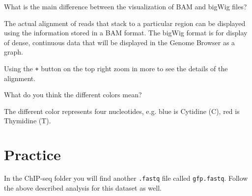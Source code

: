 \begin{questions}
What is the main difference between the visualization of BAM and bigWig files?
\begin{answer}
The actual alignment of reads that stack to a particular region can be displayed using the information stored in a BAM format.
The bigWig format is for display of dense, continuous data that will be displayed in the Genome Browser as a graph.
\end{answer}
\end{questions}

Using the \texttt{+} button on the top right zoom in more to see the details of the alignment.

\begin{questions}
What do you think the different colors mean?
\begin{answer}
The different color represents four nucleotides, e.g. blue is Cytidine (C), red is Thymidine (T).
\end{answer}
\end{questions}

\section{Practice}
In the ChIP-seq folder you will find another \texttt{.fastq} file called
\texttt{gfp.fastq}. Follow the above described analysis for this dataset as well.

